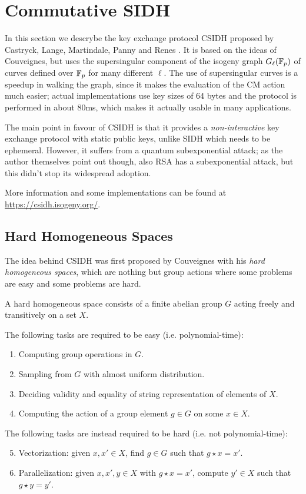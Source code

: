 \section{Commutative SIDH}
In this section we descrybe the key exchange protocol CSIDH proposed by Castryck, Lange, Martindale, Panny and Renes \cite{CSIDH}. It is based on the ideas of Couveignes, but uses the supersingular component of the isogeny graph $G_\ell(\mathbb{F}_p)$ of curves defined over $\mathbb{F}_p$ for many different $\ell$. The use of supersingular curves is a speedup in walking the graph, since it makes the evaluation of the CM action much easier; actual implementations use key sizes of 64 bytes and the protocol is performed in about 80ms, which makes it actually usable in many applications.

The main point in favour of CSIDH is that it provides a \emph{non-interactive} key exchange protocol with static public keys, unlike SIDH which needs to be ephemeral. However, it suffers from a quantum subexponential attack; as the author themselves point out though, also RSA has a subexponential attack, but this didn't stop its widespread adoption.

More information and some implementations can be found at \url{https://csidh.isogeny.org/}.

\subsection{Hard Homogeneous Spaces}
The idea behind CSIDH was first proposed by Couveignes \cite{Couveignes} with his \emph{hard homogeneous spaces}, which are nothing but group actions where some problems are easy and some problems are hard.

\begin{definition}
    A hard homogeneous space consists of a finite abelian group $G$ acting freely and transitively on a set $X$.
    
    The following tasks are required to be easy (i.e. polynomial-time):
    \begin{enumerate}
        \item Computing group operations in $G$.
        \item Sampling from $G$ with almost uniform distribution.
        \item Deciding validity and equality of string representation of elements of $X$.
        \item Computing the action of a group element $g\in G$ on some $x\in X$.
    \end{enumerate}

    The following tasks are instead required to be hard (i.e. not polynomial-time):
    \begin{enumerate}
        \setcounter{enumi}{4}
        \item Vectorization: given $x,x'\in X$, find $g\in G$ such that $g\star x=x'$.
        \item Parallelization: given $x,x',y\in X$ with $g\star x=x'$, compute $y'\in X$ such that $g\star y=y'$.
    \end{enumerate}
\end{definition}

